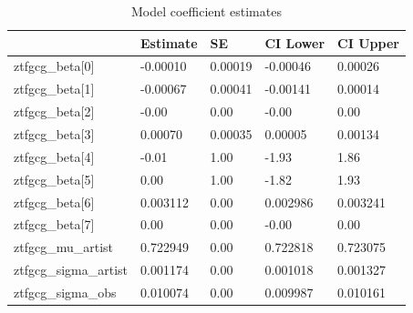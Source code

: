 \begin{table}[htbp]
\caption{Model coefficient estimates}
\label{tab:coefficients}
\begin{tabular}{lllll}
\toprule
 & Estimate & SE & CI Lower & CI Upper \\
\midrule
ztfgcg\_beta[0] & -0.00010 & 0.00019 & -0.00046 & 0.00026 \\
ztfgcg\_beta[1] & -0.00067 & 0.00041 & -0.00141 & 0.00014 \\
ztfgcg\_beta[2] & -0.00 & 0.00 & -0.00 & 0.00 \\
ztfgcg\_beta[3] & 0.00070 & 0.00035 & 0.00005 & 0.00134 \\
ztfgcg\_beta[4] & -0.01 & 1.00 & -1.93 & 1.86 \\
ztfgcg\_beta[5] & 0.00 & 1.00 & -1.82 & 1.93 \\
ztfgcg\_beta[6] & 0.003112 & 0.00 & 0.002986 & 0.003241 \\
ztfgcg\_beta[7] & 0.00 & 0.00 & -0.00 & 0.00 \\
ztfgcg\_mu\_artist & 0.722949 & 0.00 & 0.722818 & 0.723075 \\
ztfgcg\_sigma\_artist & 0.001174 & 0.00 & 0.001018 & 0.001327 \\
ztfgcg\_sigma\_obs & 0.010074 & 0.00 & 0.009987 & 0.010161 \\
\bottomrule
\end{tabular}
\end{table}
